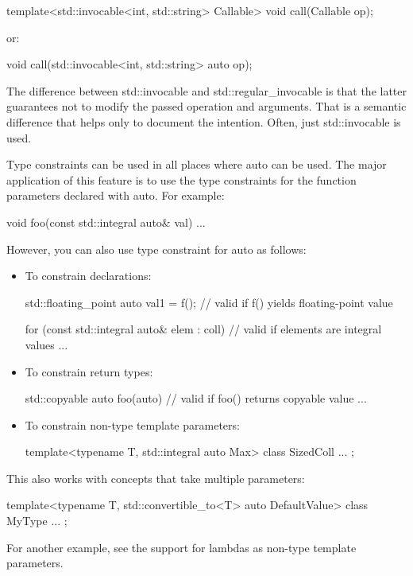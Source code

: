 \begin{cpp}
template<std::invocable<int, std::string> Callable>
void call(Callable op);
\end{cpp}

or:

\begin{cpp}
void call(std::invocable<int, std::string> auto op);
\end{cpp}

The difference between std::invocable and std::regular\_invocable is that the latter guarantees not to modify the passed operation and arguments. That is a semantic difference that helps only to document the intention. Often, just std::invocable is used.


Type constraints can be used in all places where auto can be used. The major application of this feature is to use the type constraints for the function parameters declared with auto. For example:

\begin{cpp}
void foo(const std::integral auto& val)
{
	...
}
\end{cpp}

However, you can also use type constraint for auto as follows:

\begin{itemize}
\item
To constrain declarations:

\begin{cpp}
std::floating_point auto val1 = f(); // valid if f() yields floating-point value

for (const std::integral auto& elem : coll) { // valid if elements are integral values
	...
}
\end{cpp}

\item
To constrain return types:

\begin{cpp}
std::copyable auto foo(auto) { // valid if foo() returns copyable value
	...
}
\end{cpp}

\item
To constrain non-type template parameters:

\begin{cpp}
template<typename T, std::integral auto Max>
class SizedColl {
	...
};
\end{cpp}
\end{itemize}

This also works with concepts that take multiple parameters:

\begin{cpp}
template<typename T, std::convertible_to<T> auto DefaultValue>
class MyType {
	...
};
\end{cpp}

For another example, see the support for lambdas as non-type template parameters.












